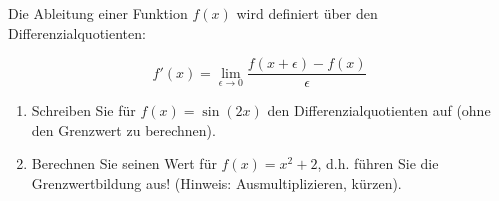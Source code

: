 \item Die Ableitung einer Funktion $f(x)$ wird definiert über den Differenzialquotienten:

$$f'(x) = \lim\limits_{\epsilon\to 0} \frac{f(x+\epsilon)-f(x)}{\epsilon}$$

\begin{enumerate}
\item Schreiben Sie für $f(x)=\sin(2x)$ den Differenzialquotienten auf (ohne den Grenzwert zu berechnen).
\item Berechnen Sie seinen Wert für $f(x)=x^2+2$, d.h. führen Sie die Grenzwertbildung aus! (Hinweis: Ausmultiplizieren, kürzen).
\end{enumerate}

